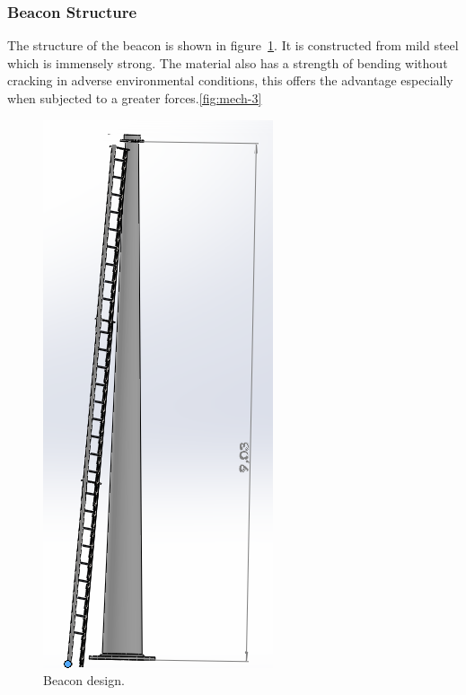 \subsubsection{Beacon Structure}

The structure of the beacon is shown in figure~\ref{fig:mech-6}. It is constructed from mild steel which is immensely strong. The material also has a strength of bending without cracking in adverse environmental conditions, this offers the advantage especially when subjected to a greater forces.\ref{fig:mech-3}

\begin{figure}[H]
\begin{center}
\includegraphics[scale=0.4]{data/mechanical/6.png}
\caption{Beacon design.}
\label{fig:mech-6}
\end{center}
\end{figure}

